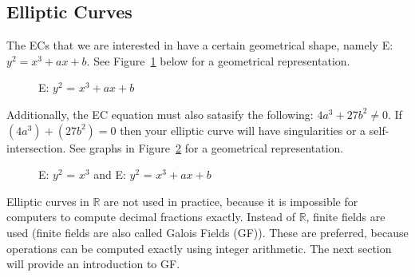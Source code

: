 \subsection{Elliptic Curves}
The  ECs that we are interested in have a certain geometrical shape, namely E: $y^2 = x^3 + ax + b$.  See Figure~\ref{fig:DH:DHKE_5} below for a geometrical representation.  
\begin{figure}[H]
	  \caption{\label{fig:DH:DHKE_5}   E: $ y^2$ = $x^3+ax+b $ }
\end{figure}
Additionally, the EC equation must also satasify the following: $4a^3 + 27b^2 \neq 0$. If $(4a^3)+(27b^2) = 0$ then your elliptic curve will have singularities or a self-intersection.  See graphs in Figure~\ref{fig:DH:DHKE_10} for a geometrical representation.
\begin{figure}[H]
	  \caption{\label{fig:DH:DHKE_10} E: $ y^2$ = $x^3$ and E: $ y^2$ = $x^3+ax+b$ }
\end{figure}
Elliptic curves in $\mathbb{R}$ are not used in practice, because it is impossible for computers to compute decimal fractions exactly.  Instead of $\mathbb{R}$, finite fields are used (finite fields are also called Galois Fields (GF)).  These are preferred, because operations can be computed exactly using integer arithmetic. The next section will provide an introduction to GF.
